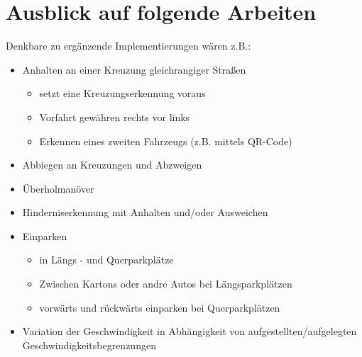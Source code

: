 \chapter{Ausblick auf folgende Arbeiten}

Denkbare zu ergänzende Implementierungen wären z.B.:

\begin{itemize}
\item Anhalten an einer Kreuzung gleichrangiger Straßen
	\begin{itemize}
	\item setzt eine Kreuzungserkennung voraus
	\item Vorfahrt gewähren \glqq rechts vor links\grqq
	\item Erkennen eines zweiten Fahrzeugs (z.B. mittels QR-Code)
	\end{itemize}
\item Abbiegen an Kreuzungen und Abzweigen
\item Überholmanöver
\item Hinderniserkennung mit Anhalten und/oder Ausweichen 
\item Einparken
	\begin{itemize}
	\item in Längs - und Querparkplätze
	\item Zwischen Kartons oder andre Autos bei Längsparkplätzen
	\item vorwärts und rückwärts einparken bei Querparkplätzen
	\end{itemize}
\item Variation der Geschwindigkeit in Abhängigkeit von aufgestellten/aufgelegten Geschwindigkeitsbegrenzungen
\end{itemize}
